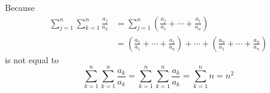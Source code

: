 \documentclass[a4paper,12pt]{article}
\makeatletter
\newtheorem*{solution}{Solution}
\theoremstyle{definition}
\renewenvironment{solution}[1][Solution] {\par\pushQED{\qed}\normalfont\topsep6\p@\@plus6\p@\relax\trivlist\item[\hskip\labelsep\bfseries#1\@addpunct{.}]\ignorespaces}{\popQED\endtrivlist\@endpefalse} \makeatother
\newenvironment{problems}{\begin{list}{}{\renewcommand{\makelabel}[1]{\textbf{##1}\hfil}}}{\end{list}}
\makeatother
\begin{document}
\begin{problems}
\begin{solution}
        Because
        \begin{align*}
            \sum_{j=1}^n\sum_{k=1}^n\frac{a_j}{a_k} &= \sum_{j=1}^n\left(\frac{a_j}{a_1} + \cdots + \frac{a_j}{a_n}\right)\\
            &= \left(\frac{a_1}{a_1} + \cdots + \frac{a_1}{a_n}\right) + \cdots + \left(\frac{a_n}{a_1} + \cdots + \frac{a_n}{a_n}\right) 
        \end{align*}
        is not equal to
        \begin{equation*}
            \sum_{k=1}^n\sum_{k=1}^n \frac{a_k}{a_k} = \sum_{k=1}^n\sum_{k=1}^n \frac{a_k}{a_k} = \sum_{k=1}^n n = n^2
        \end{equation*}

    \end{solution}
\end{problems}
\end{document}
